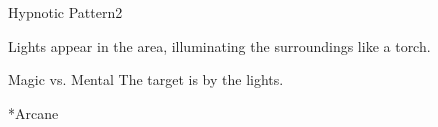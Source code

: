 \begin{spellsection}{Hypnotic Pattern}{2}
    \begin{spellheader}
    \end{spellheader}
    \begin{spellcontent}
        \begin{spelltargetinginfo}
        \end{spelltargetinginfo}
        \begin{spelleffects}
            \spelleffect Lights appear in the area, illuminating the surroundings like a torch.
            \spelldur \durshort
        \end{spelleffects}
    \end{spellcontent}
    \begin{spellsubcontent}
        \begin{spelltargetinginfo}
        \end{spelltargetinginfo}
        \begin{spelleffects}
            \begin{spellattack}{Magic vs. Mental}
                \spellsuccess The target is \fascinated by the lights.
            \end{spellattack}
        \end{spelleffects}
    \end{spellsubcontent}
    \begin{spellfooter}
        *{Arcane}
        \miscastyou
    \end{spellfooter}
\end{spellsection}

